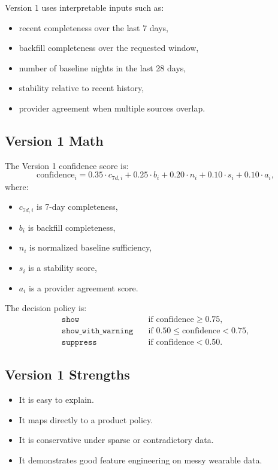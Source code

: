 \documentclass[11pt]{article}
\begin{document}
Version 1 uses interpretable inputs such as:
\begin{itemize}[leftmargin=1.5em]
    \item recent completeness over the last 7 days,
    \item backfill completeness over the requested window,
    \item number of baseline nights in the last 28 days,
    \item stability relative to recent history,
    \item provider agreement when multiple sources overlap.
\end{itemize}

\subsection{Version 1 Math}

The Version 1 confidence score is:
\[
\text{confidence}_i
=
0.35 \cdot c_{7d,i}
+ 0.25 \cdot b_i
+ 0.20 \cdot n_i
+ 0.10 \cdot s_i
+ 0.10 \cdot a_i,
\]
where:
\begin{itemize}[leftmargin=1.5em]
    \item $c_{7d,i}$ is 7-day completeness,
    \item $b_i$ is backfill completeness,
    \item $n_i$ is normalized baseline sufficiency,
    \item $s_i$ is a stability score,
    \item $a_i$ is a provider agreement score.
\end{itemize}

The decision policy is:
\begin{align*}
\texttt{show} &\quad \text{if confidence} \ge 0.75, \\
\texttt{show\_with\_warning} &\quad \text{if } 0.50 \le \text{confidence} < 0.75, \\
\texttt{suppress} &\quad \text{if confidence} < 0.50.
\end{align*}

\subsection{Version 1 Strengths}

\begin{itemize}[leftmargin=1.5em]
    \item It is easy to explain.
    \item It maps directly to a product policy.
    \item It is conservative under sparse or contradictory data.
    \item It demonstrates good feature engineering on messy wearable data.
\end{itemize}
\end{document}
